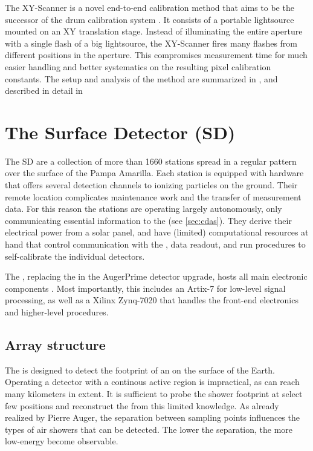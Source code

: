 The XY-Scanner is a novel end-to-end calibration method that aims to be the
successor of the drum calibration system \cite{engelNewEndtoendCalibration2017}.
It consists of a portable \IS lightsource mounted on an XY translation stage. 
Instead of illuminating the entire aperture with a single flash of a big 
lightsource, the XY-Scanner fires many flashes from different positions in the 
aperture. This compromises measurement time for much easier handling and better
systematics on the resulting pixel calibration constants. The setup and analysis
of the method are summarized in , and described in
detail in \cite{schaferXYScannerVersatileMethod2023}

\section{The Surface Detector (SD)}
\label{sec:sd}

The \acf{SD} are a collection of more than 1660 stations spread in a regular 
pattern over the surface of the Pampa Amarilla. Each station is equipped with 
hardware that offers several detection channels to ionizing particles on the 
ground. Their remote location complicates maintenance work and the transfer of 
measurement data. For this reason the stations are operating largely 
autonomously, only communicating essential information to the \CDAS (see 
\cref{sec:cdas}). They derive their electrical power from a solar panel, and 
have (limited) computational resources at hand that control communication with 
the \CDAS, data readout, and run procedures to self-calibrate the individual 
detectors. 

The \UUB, replacing the \UB in the AugerPrime detector upgrade, hosts all main 
electronic components \cite{collaborationPierreAugerObservatory2016}. Most
importantly, this includes an Artix-7 \FPGA \cite{xilinx7SeriesFPGAs2020} for 
low-level signal processing, as well as a Xilinx Zynq-7020 \SOC 
\cite{amdZynq7000SoC2023} that handles the front-end electronics and 
higher-level procedures.

\subsection{Array structure}
\label{ssec:array-structure}

The \SD is designed to detect the footprint of an \EAS on the surface of the 
Earth. Operating a detector with a continous active region is impractical, as 
\EASs can reach many kilometers in extent. It is sufficient to probe the shower
footprint at select few positions and reconstruct the \EAS from this limited 
knowledge. As already realized by Pierre Auger, the separation between sampling 
points influences the types of air showers that can be detected. The lower the 
separation, the more low-energy \EAS become observable.

